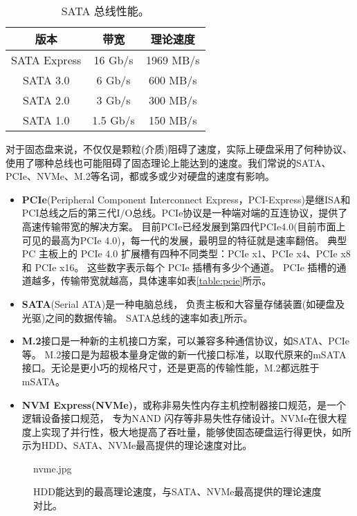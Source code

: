 \documentclass[final]{cvpr}
\begin{document}
\begin{table}[]\centering
\begin{tabular}{ccc}
\hline
版本           & 带宽      & 理论速度    \\ \hline
SATA Express & 16 Gb/s  & 1969 MB/s  \\
SATA 3.0     & 6 Gb/s   & 600 MB/s     \\
SATA 2.0     & 3 Gb/s   & 300 MB/s     \\
SATA 1.0     & 1.5 Gb/s & 150 MB/s   \\ \hline
\end{tabular}
\caption{SATA 总线性能\cite{Web/wiki-sata}。}\label{table:sata}
\end{table}

对于固态盘来说，不仅仅是颗粒(介质)阻碍了速度，实际上硬盘采用了何种协议、使用了哪种总线也可能阻碍了固态理论上能达到的速度。我们常说的SATA、PCIe、NVMe、M.2等名词，都或多或少对硬盘的速度有影响。

\begin{itemize}
    \item \textbf{PCIe}(Peripheral Component Interconnect Express，PCI-Express)是继ISA和PCI总线之后的第三代I/O总线。PCIe协议是一种端对端的互连协议，提供了高速传输带宽的解决方案。
    目前PCIe已经发展到第四代PCIe4.0(目前市面上可见的最高为PCIe 4.0)，每一代的发展，最明显的特征就是速率翻倍。
    典型 PC 主板上的 PCIe 4.0 扩展槽有四种不同类型：PCIe x1、PCIe x4、PCIe x8 和 PCIe x16。 这些数字表示每个 PCIe 插槽有多少个通道。 
    PCIe 插槽的通道越多，传输带宽就越高，具体速率如表\ref{table:pcie}所示。
    \item \textbf{SATA}(Serial ATA)是一种电脑总线，
    负责主板和大容量存储装置(如硬盘及光驱)之间的数据传输。
    SATA总线的速率如表\ref{table:sata}所示。
    \item \textbf{M.2}接口是一种新的主机接口方案，可以兼容多种通信协议，如SATA、PCIe等。
    M.2接口是为超极本量身定做的新一代接口标准，以取代原来的mSATA接口。无论是更小巧的规格尺寸，还是更高的传输性能，M.2都远胜于mSATA。
    \item \textbf{NVM Express(NVMe)}，或称非易失性内存主机控制器接口规范，是一个逻辑设备接口规范，
    专为NAND 闪存等非易失性存储设计。NVMe在很大程度上实现了并行性，极大地提高了吞吐量，能够使固态硬盘运行得更快，如所示为HDD、SATA、NVMe最高提供的理论速度对比。
\end{itemize}

\begin{figure}
  	\begin{overpic}[width=\columnwidth]{nvme.jpg}\end{overpic}
    \caption{HDD能达到的最高理论速度，与SATA、NVMe最高提供的理论速度对比\cite{Web/nvme}。}\label{fig:nvme}
\end{figure}
\end{document}
